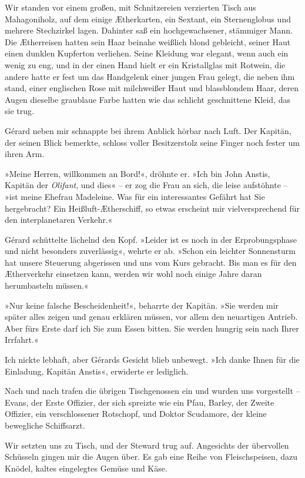 \bigpar

Wir standen vor einem großen, mit Schnitzereien verzierten Tisch
aus Mahagoniholz, auf dem einige Ætherkarten, ein Sextant, ein
Sternenglobus und mehrere Stechzirkel lagen. Dahinter saß ein
hochgewachsener, stämmiger Mann. Die Ætherreisen hatten sein Haar
beinahe weißlich blond gebleicht, seiner Haut einen dunklen
Kupferton verliehen. Seine Kleidung war elegant, wenn auch ein
wenig zu eng, und in der einen Hand hielt er ein Kristallglas mit
Rotwein, die andere hatte er fest um das Handgelenk einer jungen
Frau gelegt, die neben ihm stand, einer englischen Rose mit
milchweißer Haut und blassblondem Haar, deren Augen dieselbe
graublaue Farbe hatten wie das schlicht geschnittene Kleid, das sie
trug.

Gérard neben mir schnappte bei ihrem Anblick hörbar nach Luft. Der
Kapitän, der seinen Blick bemerkte, schloss voller Besitzerstolz
seine Finger noch fester um ihren Arm.

»Meine Herren, willkommen an Bord!«, dröhnte er. »Ich bin John
Anstis, Kapitän der \emph{Olifant}, und dies« – er zog die Frau an
sich, die leise aufstöhnte – »ist meine Ehefrau Madeleine. Was für
ein interessantes Gefährt hat Sie hergebracht? Ein
Heißluft-Ætherschiff, so etwas erscheint mir vielversprechend für
den interplanetaren Verkehr.«

Gérard schüttelte lächelnd den Kopf. »Leider ist es noch in der
Erprobungsphase und nicht besonders zuverlässig«, wehrte er ab.
»Schon ein leichter Sonnensturm hat unsere Steuerung abgerissen und
uns vom Kurs gebracht. Bis man es für den Ætherverkehr einsetzen
kann, werden wir wohl noch einige Jahre daran herumbasteln
müssen.«

»Nur keine falsche Bescheidenheit!«, beharrte der Kapitän. »Sie
werden mir später alles zeigen und genau erklären müssen, vor allem
den neuartigen Antrieb. Aber fürs Erste darf ich Sie zum Essen
bitten. Sie werden hungrig sein nach Ihrer Irrfahrt.«

Ich nickte lebhaft, aber Gérards Gesicht blieb unbewegt. »Ich danke
Ihnen für die Einladung, Kapitän Anstis«, erwiderte er lediglich.

Nach und nach trafen die übrigen Tischgenossen ein und wurden uns
vorgestellt – Evans, der Erste Offizier, der sich spreizte wie ein
Pfau, Barley, der Zweite Offizier, ein verschlossener Rotschopf,
und Doktor Scudamore, der kleine bewegliche Schiffsarzt.

Wir setzten uns zu Tisch, und der Steward trug auf. Angesichts der
übervollen Schüsseln gingen mir die Augen über. Es gab eine Reihe
von Fleischspeisen, dazu Knödel, kaltes eingelegtes Gemüse und
Käse.

